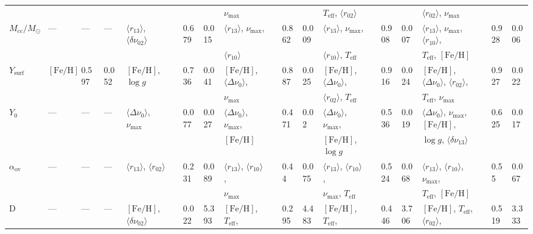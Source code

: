 {\begin{landscape}
\begin{table}
\begin{tabular}{  l | l  l  l | l  l  l  l | l  l  l  l | l  l  l  l | l  l  l  l   }
  &  &  &  &  &  &  &  &  $\nu_{\max}$ &  &  &  & $T_{\text{eff}}$, $\langle r_{02}\rangle$ &&  & & $\langle r_{02}\rangle$, $\nu_{\max}$ &  &  &\\[3pt] 
  $M_{\text{cc}}/M_\odot$ & --- & --- & --- & $\langle r_{13}\rangle$, $\langle\delta\nu_{02}\rangle$ && 0.679 & 0.015 & $\langle r_{13}\rangle$, $\nu_{\max}$, & &0.862 & 0.009 & $\langle r_{13}\rangle$, $\nu_{\max}$, && 0.908 & 0.007 & $\langle r_{13}\rangle$, $\nu_{\max}$, $\langle r_{10}\rangle$, && 0.928 & 0.006\\
  &  &  &  &  &  &  &  &  $\langle r_{10}\rangle$ &  &  &  & $\langle r_{10}\rangle$, $T_{\text{eff}}$ &&  & & $T_{\text{eff}}$, $[\text{Fe/H}]$ &  &  &\\[3pt]
   $Y_{\text{surf}}$ & $[\text{Fe/H}]$ & 0.597 & 0.052 & $[\text{Fe/H}]$, $\log{} g$ && 0.736 & 0.041 & $[\text{Fe/H}]$, $\langle\Delta\nu_0\rangle$, && 0.887 & 0.025 & $[\text{Fe/H}]$, $\langle\Delta\nu_0\rangle$, && 0.916 & 0.024 & $[\text{Fe/H}]$, $\langle\Delta\nu_0\rangle$, $\langle r_{02}\rangle$, && 0.927 & 0.022\\
  &  &  &  &  &  &  &  &  $\nu_{\max}$ &  &  &  & $\langle r_{02}\rangle$, $T_{\text{eff}}$ &&  & & $T_{\text{eff}}$, $\nu_{\max}$ &  &  &\\[3pt] 
   $Y_0$ & --- & --- & --- & $\langle\Delta\nu_0\rangle$, $\nu_{\max}$ && 0.077 & 0.027 & $\langle\Delta\nu_0\rangle$, $\nu_{\max}$, && 0.471 & 0.02 & $\langle\Delta\nu_0\rangle$, $\nu_{\max}$, && 0.536 & 0.019 & $\langle\Delta\nu_0\rangle$, $\nu_{\max}$, $[\text{Fe/H}]$, && 0.625 & 0.017\\
  &  &  &  &  &  &  &  &  $[\text{Fe/H}]$ &  &  &  & $[\text{Fe/H}]$, $\log{} g$ &&  & & $\log{} g$, $\langle\delta\nu_{13}\rangle$ &  &  &\\[3pt] 
    $\alpha_{\text{ov}}$ & --- & --- & --- & $\langle r_{13}\rangle$, $\langle r_{02}\rangle$ && 0.231 & 0.089 & $\langle r_{13}\rangle$, $\langle r_{10}\rangle$, && 0.44 & 0.075 & $\langle r_{13}\rangle$,  $\langle r_{10}\rangle$, && 0.524 & 0.068 & $\langle r_{13}\rangle$, $\langle r_{10}\rangle$, $\nu_{\max}$, && 0.55 & 0.067\\
  &  &  &  &  &  &  &  &  $\nu_{\max}$ &  &  &  & $\nu_{\max}$, $T_{\text{eff}}$ &&  & & $T_{\text{eff}}$, $[\text{Fe/H}]$ &  &  &\\[3pt] 
   D & --- & --- & --- & $[\text{Fe/H}]$, $\langle\delta\nu_{02}\rangle$ && 0.022 & 5.393 & $[\text{Fe/H}]$, $T_{\text{eff}}$, && 0.295 & 4.483 & $[\text{Fe/H}]$, $T_{\text{eff}}$, && 0.446 & 3.706 & $[\text{Fe/H}]$,  $T_{\text{eff}}$, $\langle r_{02}\rangle$, && 0.519 & 3.333\\

\end{tabular}
\end{table}
\end{landscape}}
